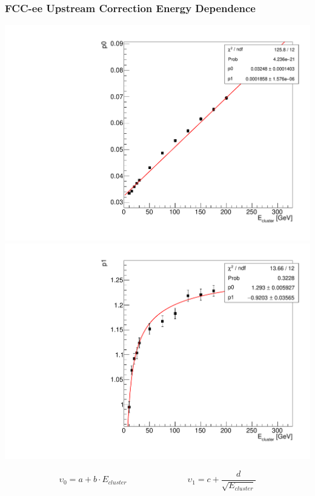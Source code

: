 \documentclass{beamer}
\begin{document}
\begin{frame}
  \frametitle{FCC-ee Upstream Correction Energy Dependence}

  \begin{adjustwidth}{-9mm}{-9mm}
    \includegraphics[width=0.49\linewidth]{figures/upstream/graph_upstream_p0.pdf}
    \includegraphics[width=0.49\linewidth]{figures/upstream/graph_upstream_p1.pdf}\\[-3ex]
  \end{adjustwidth}
  \begin{equation*}
    \upsilon_0 = a + b \cdot E_{cluster}  \hspace{3cm}
    \upsilon_1 = c + \frac{d}{\sqrt{E_{cluster}}}
  \end{equation*}
\end{frame}
\end{document}
